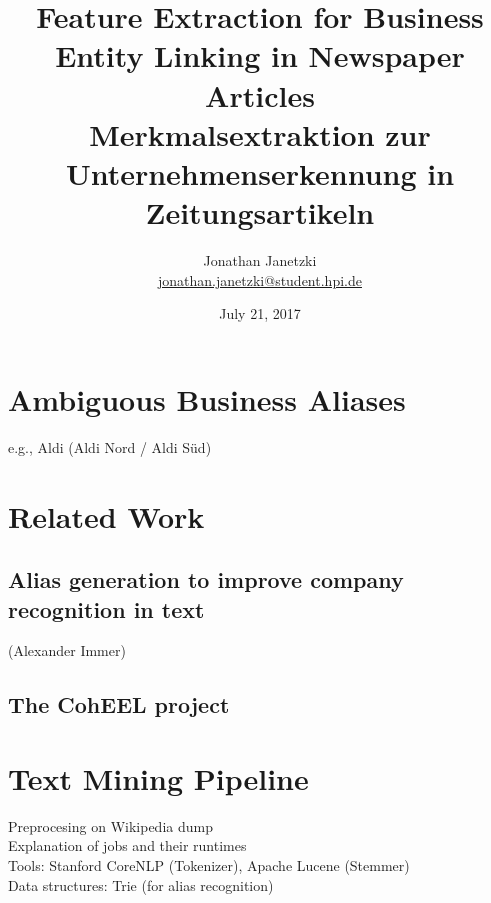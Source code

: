 \documentclass[
        a4paper,     %
        titlepage,   %
        twoside,     %
        parskip      %
        ]{scrartcl} %
\title{Feature Extraction for Business Entity Linking in Newspaper Articles
\\ \bigskip 
\large{Merkmalsextraktion zur Unternehmenserkennung in Zeitungsartikeln}}
\author{Jonathan Janetzki\\{\small{\url{jonathan.janetzki@student.hpi.de}}}}
\date{July 21, 2017}
\renewenvironment{abstract}
 {\small
  \begin{center}
  \bfseries \abstractname\vspace{-.6em}\vspace{0pt}
  \end{center}
  \list{}{
    \setlength{\leftmargin}{.6cm}%
    \setlength{\rightmargin}{\leftmargin}%
  }%
  \item\relax}
 {\endlist}
\begin{document}
\maketitle
\newpage



\begin{abstract}

\end{abstract}
\newpage

{\small\tableofcontents}
\newpage

\section{Ambiguous Business Aliases}
e.g., Aldi (Aldi Nord / Aldi Süd)

\section{Related Work}
\subsection{Alias generation to improve company recognition in text}
(Alexander Immer)
\subsection{The CohEEL project}

\section{Text Mining Pipeline}
Preprocesing on Wikipedia dump\\
Explanation of jobs and their runtimes\\
Tools: Stanford CoreNLP (Tokenizer), Apache Lucene (Stemmer)\\
Data structures: Trie (for alias recognition)\\
\end{document}
